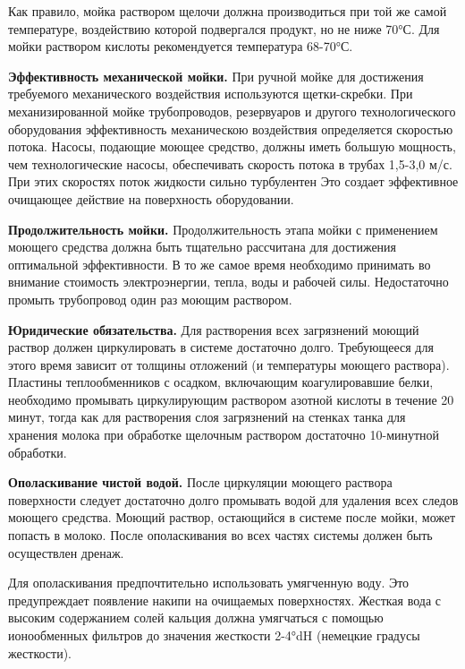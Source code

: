 {\par \redline Как правило, мойка раствором щелочи должна производиться при той же самой температуре, воздействию которой подвергался продукт, но не ниже 70°С. Для мойки раствором кислоты рекомендуется температура 68-70°С.

\par \redline \textbf{Эффективность механической мойки.} При ручной мойке для достижения требуемого механического воздействия используются щетки-скребки. При механизированной мойке трубопроводов, резервуаров и другого технологического оборудования эффективность механическою воздействия определяется скоростью потока. Насосы, подающие моющее средство, должны иметь большую мощность, чем технологические насосы, обеспечивать скорость потока в трубах 1,5-3,0 м/с. При этих скоростях поток жидкости сильно турбулентен Это создает эффективное очищающее действие на поверхность оборудовании.

\par \redline \textbf{Продолжительность мойки.} Продолжительность этапа мойки с применением моющего средства должна быть тщательно рассчитана для достижения оптимальной эффективности. В то же самое время необходимо принимать во внимание стоимость электроэнергии, тепла, воды и рабочей силы. Недостаточно промыть трубопровод один раз моющим раствором.

\par \redline \textbf{Юридические обязательства.} Для растворения всех загрязнений моющий раствор должен циркулировать в системе достаточно долго. Требующееся для этого время зависит от толщины отложений (и температуры моющего раствора). Пластины теплообменников с осадком, включающим коагулировавшие белки, необходимо промывать циркулирующим раствором азотной кислоты в течение 20 минут, тогда как для растворения слоя загрязнений на стенках танка для хранения молока при обработке щелочным раствором достаточно 10-минутной обработки.

\par \redline \textbf{Ополаскивание чистой водой.} После циркуляции моющего раствора поверхности следует достаточно долго промывать водой для удаления всех следов моющего средства. Моющий раствор, остающийся в системе после мойки, может попасть в молоко. После ополаскивания во всех частях системы должен быть осуществлен дренаж.

\par \redline Для ополаскивания предпочтительно использовать умягченную воду. Это предупреждает появление накипи на очищаемых поверхностях. Жесткая вода с высоким содержанием солей кальция должна умягчаться с помощью ионообменных фильтров до значения жесткости 2-4°dH (немецкие градусы жесткости). 

}
